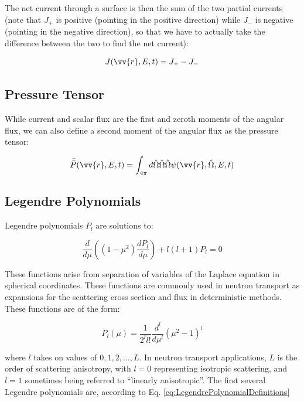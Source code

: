 \documentclass[10pt]{article}
\begin{document}
\begin{flushleft}
The net current through a surface is then the sum of the two partial currents (note that \(J_+\) is positive (pointing in the positive direction) while \(J_-\) is negative (pointing in the negative direction), so that we have to actually take the difference between the two to find the net current):

\begin{equation}
\label{eq:TotalCurrent}
J (\vv{r}, E, t) = J_+ - J_-
\end{equation}

\subsection{Pressure Tensor}

While current and scalar flux are the first and zeroth moments of the angular flux, we can also define a second moment of the angular flux as the pressure tensor:

\begin{equation}
\label{eq:PressureTensor}
\bar{\bar{P}}(\vv{r},E,t)=\int_{4\pi}^{}d\hat{\Omega}\hat{\Omega}\hat{\Omega}\psi(\vv{r},\hat{\Omega},E,t)
\end{equation}

\subsection{Legendre Polynomials}

Legendre polynomials \(P_l\) are solutions to:

\begin{equation}
\label{eq:LegendrePolynomialDiffEq}
\frac{d}{d\mu} \left((1-\mu^2) \frac{dP_l}{d\mu}\right) + l(l+1)P_l = 0
\end{equation}

These functions arise from separation of variables of the Laplace equation in spherical coordinates. These functions are commonly used in neutron transport as expansions for the scattering cross section and flux in deterministic methods. These functions are of the form:

\begin{equation}
\label{eq:LegendrePolynomialDefinitions}
P_l (\mu) = \frac{1}{2^l l!} \frac{d^l}{d\mu^l} \left(\mu^2 -1\right)^l
\end{equation}

where \(l\) takes on values of \(0, 1, 2, ..., L\). In neutron transport applications, \(L\) is the order of scattering anisotropy, with \(l=0\) representing isotropic scattering, and \(l = 1\) sometimes being referred to ``linearly anisotropic''. The first several Legendre polynomials are, according to Eq. \ref{eq:LegendrePolynomialDefinitions}


\end{flushleft}
\end{document}
